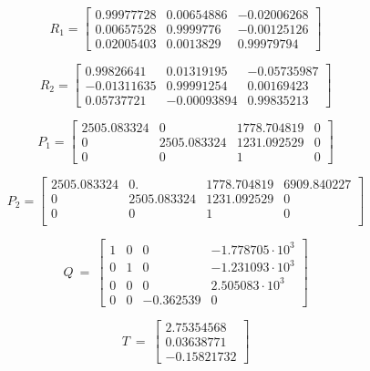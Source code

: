 \begin{equation}\label{eq::R1}
R_1 = \begin{bmatrix}
0.99977728 & 0.00654886 & -0.02006268\\
0.00657528 & 0.9999776 & -0.00125126\\
0.02005403 & 0.0013829 & 0.99979794
\end{bmatrix}
\end{equation}

\begin{equation}\label{eq::R2}
R_2 = \begin{bmatrix}
0.99826641 & 0.01319195 & -0.05735987\\
-0.01311635 & 0.99991254 & 0.00169423\\
0.05737721 & -0.00093894 & 0.99835213
\end{bmatrix}
\end{equation}

\begin{equation}\label{eq::P1}
P_1 = \begin{bmatrix}
2505.083324 & 0 & 1778.704819 & 0\\
0 & 2505.083324 & 1231.092529  & 0\\
0 & 0 & 1 & 0
\end{bmatrix}
\end{equation}

\begin{equation}\label{eq::P2}
P_2 = \begin{bmatrix}
2505.083324 &    0.       & 1778.704819 & 6909.840227\\
 0          & 2505.083324 & 1231.092529 &    0        \\
 0          &    0        &    1        &    0         \\
\end{bmatrix}
\end{equation}

\begin{equation}\label{eq::Q}
Q\ =\ \begin{bmatrix}
1 & 0 & 0 & -1.778705\cdot10^3\\
0 & 1 & 0 & -1.231093\cdot10^3\\
0 & 0 & 0 & 2.505083\cdot10^3\\
0 & 0 & -0.362539 & 0
\end{bmatrix}
\end{equation}

\begin{equation}\label{eq::T}
T\ =\ \begin{bmatrix}
2.75354568\\
0.03638771\\
-0.15821732
\end{bmatrix}
\end{equation}


